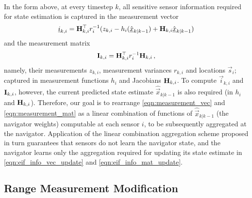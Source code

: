 \documentclass[10pt,letterpaper,oneside,twocolumn,journal]{IEEEtran}
\theoremstyle{definition}
\theoremstyle{definition}
\theoremstyle{remark}
\begin{document}
In the form above, at every timestep $k$, all sensitive sensor information required for state estimation is captured in the measurement vector
\begin{equation}
    \vec{i}_{k,i} = \mat{H}^\top_{k,i} r^{-1}_i (z_{k,i} - h_i(\hat{\vec{x}}_{k|k-1}) + \mat{H}_{k,i}\hat{\vec{x}}_{k|k-1}) \label{eqn:measurement_vec}
\end{equation}
and the measurement matrix
\begin{equation}
    \mat{I}_{k,i} = \mat{H}^\top_{k,i} r^{-1}_i \mat{H}_{k,i}\,, \label{eqn:measurement_mat}
\end{equation}
namely, their measurements $z_{k,i}$, measurement variances $r_{k,i}$ and locations $\vec{s}_i$; captured in measurement functions $h_i$ and Jacobians ${{\mathbf{H}}}_{k,i}$. To compute $\vec{i}_{k,i}$ and ${{\mathbf{I}}}_{k,i}$, however, the current predicted state estimate $\hat{\vec{x}}_{k|k-1}$ is also required (in $h_i$ and ${{\mathbf{H}}}_{k,i}$). Therefore, our goal is to rearrange \eqref{eqn:measurement_vec} and \eqref{eqn:measurement_mat} as a linear combination of functions of $\hat{\vec{x}}_{k|k-1}$ (the navigator weights) computable at each sensor $i$, to be subsequently aggregated at the navigator. Application of the linear combination aggregation scheme proposed in turn guarantees that sensors do not learn the navigator state, and the navigator learns only the aggregation required for updating its state estimate in \eqref{eqn:eif_info_vec_update} and \eqref{eqn:eif_info_mat_update}.

% 
% 

\subsection{Range Measurement Modification} \label{subsec:range_measurement_mod}
\end{document}
